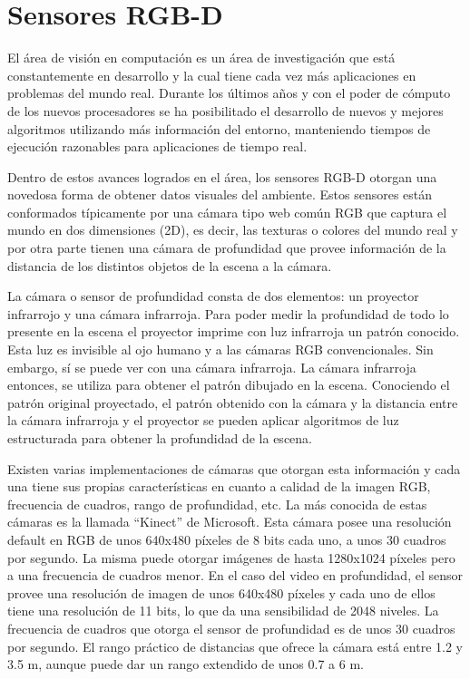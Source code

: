 \chapter{Sensores RGB-D}\label{sensores_rgbd}
El área de visión en computación es un área de investigación que está constantemente en desarrollo y la cual tiene cada vez más aplicaciones en problemas del mundo real. Durante los últimos años y con el poder de cómputo de los nuevos procesadores se ha posibilitado el desarrollo de nuevos y mejores algoritmos utilizando más información del entorno, manteniendo tiempos de ejecución razonables para aplicaciones de tiempo real.

Dentro de estos avances logrados en el área, los sensores RGB-D otorgan una novedosa forma de obtener datos visuales del ambiente. Estos sensores están conformados típicamente por una cámara tipo web común RGB que captura el mundo en dos dimensiones (2D), es decir, las texturas o colores del mundo real y por otra parte tienen una cámara de profundidad que provee información de la distancia de los distintos objetos de la escena a la cámara.

La cámara o sensor de profundidad consta de dos elementos: un proyector infrarrojo y una cámara infrarroja. Para poder medir la profundidad de todo lo presente en la escena el proyector imprime con luz infrarroja un patrón conocido. Esta luz es invisible al ojo humano y a las cámaras RGB convencionales. Sin embargo, sí se puede ver con una cámara infrarroja. La cámara infrarroja entonces, se utiliza para obtener el patrón dibujado en la escena. Conociendo el patrón original proyectado, el patrón obtenido con la cámara y la distancia entre la cámara infrarroja y el proyector se pueden aplicar algoritmos de luz estructurada para obtener la profundidad de la escena.

Existen varias implementaciones de cámaras que otorgan esta información y cada una tiene sus propias características en cuanto a calidad de la imagen RGB, frecuencia de cuadros, rango de profundidad, etc. La más conocida de estas cámaras es la llamada ``Kinect'' de Microsoft. Esta cámara posee una resolución default en RGB de unos 640x480 píxeles de 8 bits cada uno, a unos 30 cuadros por segundo. La misma puede otorgar imágenes de hasta 1280x1024 píxeles pero a una frecuencia de cuadros menor. En el caso del video en profundidad, el sensor provee una resolución de imagen de unos 640x480 píxeles y cada uno de ellos tiene una resolución de 11 bits, lo que da una sensibilidad de 2048 niveles. La frecuencia de cuadros que otorga el sensor de profundidad es de unos 30 cuadros por segundo. El rango práctico de distancias que ofrece la cámara está entre 1.2 y 3.5 m, aunque puede dar un rango extendido de unos 0.7 a 6 m.

